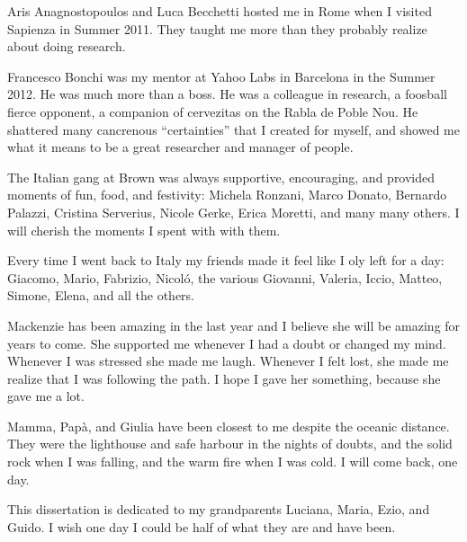 Aris Anagnostopoulos and Luca Becchetti hosted me in Rome when I visited
Sapienza in Summer 2011. They taught me more than they probably realize about
doing research. 

Francesco Bonchi was my mentor at Yahoo Labs in Barcelona in the Summer 2012. He
was much more than a boss. He was a colleague in research, a foosball fierce
opponent, a companion of cervezitas on the Rabla de Poble Nou.  He shattered
many cancrenous ``certainties'' that I created for myself, and showed me what it
means to be a great researcher and manager of people.

The Italian gang at Brown was always supportive, encouraging, and provided
moments of fun, food, and festivity:  Michela Ronzani, Marco Donato, Bernardo
Palazzi, Cristina Serverius, Nicole Gerke, Erica Moretti, and many many others.
I will cherish the moments I spent with with them.

Every time I went back to Italy my friends made it feel like I oly
left for a day: Giacomo, Mario, Fabrizio, Nicol\'o, the various Giovanni,
Valeria, Iccio, Matteo, Simone, Elena, and all the others. 

Mackenzie has been amazing in the last year and I believe she will be
amazing for years to come. She supported me whenever I had a doubt or changed
my mind. Whenever I was stressed she made me laugh. Whenever I felt lost, she
made me realize that I was following the path. I hope I gave her something,
because she gave me a lot.

Mamma, Pap\`a, and Giulia have been closest to me despite the oceanic distance.
They were the lighthouse and safe harbour in the nights of doubts, and the solid
rock when I was falling, and the warm fire when I was cold. I will come back,
one day.

This dissertation is dedicated to my grandparents Luciana, Maria, Ezio, and
Guido. I wish one day I could be half of what they are and have been.

